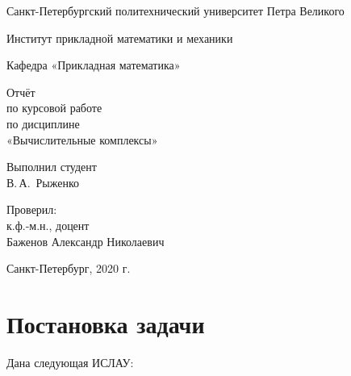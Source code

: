 \documentclass[12pt,a4paper]{scrartcl}
\begin{document}
\begin{titlepage}
  \begin{center}

    Санкт-Петербургский политехнический университет Петра Великого

    \vspace{0.25cm}
    
    Институт прикладной математики и механики
    
    Кафедра «Прикладная математика»
    \vfill

	\vspace{0.25cm}
	    Отчёт\\
	по курсовой работе\\
	по дисциплине\\
	«Вычислительные комплексы»

  \bigskip

\end{center}
\vfill

\newlength{\ML}
\hfill\begin{minipage}{0.4\textwidth}
  Выполнил студент\\ В.\,А.~Рыженко\\
\end{minipage}%
\bigskip

\hfill\begin{minipage}{0.4\textwidth}
  Проверил:\\
к.ф.-м.н., доцент\\
Баженов Александр Николаевич\\
\end{minipage}%
\vfill

\begin{center}
  Санкт-Петербург, 2020 г.
\end{center}
\end{titlepage}

\tableofcontents
\newpage


\section{Постановка задачи}

Дана следующая ИСЛАУ:
\end{document}
